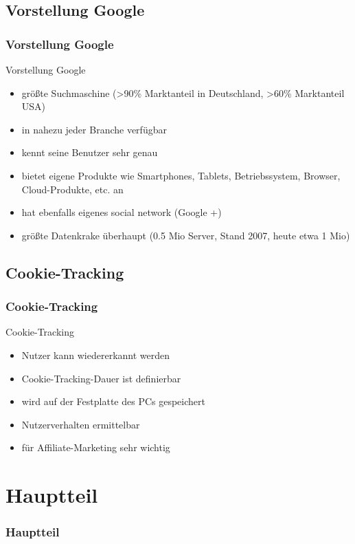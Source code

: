\documentclass[xcolor=dvipsnames]{beamer}
\begin{document}
\subsection{Vorstellung Google}
\begin{frame} %
  \frametitle{Vorstellung Google} %
  \begin{block}{Vorstellung Google}
	  \begin{itemize}
	  	\item größte Suchmaschine (>90\% Marktanteil in Deutschland, >60\% Marktanteil USA)
		\item in nahezu jeder Branche verfügbar
		\item kennt seine Benutzer sehr genau
		\item bietet eigene Produkte wie Smartphones, Tablets, Betriebssystem, Browser, Cloud-Produkte, etc. an
		\item hat ebenfalls eigenes social network (Google +)
		\item größte Datenkrake überhaupt (0.5 Mio Server, Stand 2007, heute etwa 1 Mio)
	  \end{itemize}
  \end{block}
\end{frame}

\subsection{Cookie-Tracking}
\begin{frame} %
  \frametitle{Cookie-Tracking} %
  \begin{block}{Cookie-Tracking}
	  \begin{itemize}
	  	\item Nutzer kann wiedererkannt werden
		\item Cookie-Tracking-Dauer ist definierbar
		\item wird auf der Festplatte des PCs gespeichert
		\item Nutzerverhalten ermittelbar
		\item für Affiliate-Marketing sehr wichtig
	  \end{itemize}
  \end{block}
\end{frame}


\section{Hauptteil}
\begin{frame} %
  \frametitle{Hauptteil} %
\end{frame}
\end{document}
